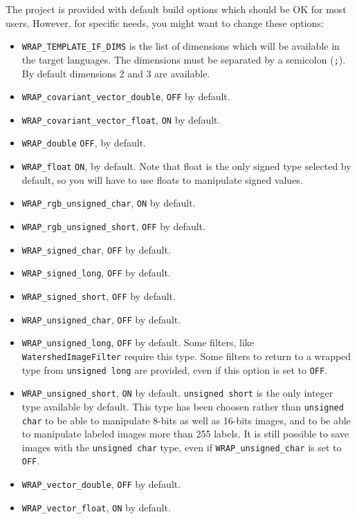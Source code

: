 \documentclass{InsightArticle}
\begin{document}
The project is provided with default build options which should be OK for most
users. However, for specific needs, you might want to change these options:
\begin{itemize}
  \item \verb$WRAP_TEMPLATE_IF_DIMS$ is the list of dimensions which will be available in the
target languages. The dimensions must be separated by a semicolon (\verb$;$).
By default dimensions 2 and 3 are available.
  \item \verb$WRAP_covariant_vector_double$, \verb$OFF$ by default.
  \item \verb$WRAP_covariant_vector_float$, \verb$ON$ by default.
  \item \verb$WRAP_double$ \verb$OFF$, by default.
  \item \verb$WRAP_float$ \verb$ON$, by default. Note that float is the only signed
type selected by default, so you will have to use floats to manipulate signed
values.
  \item \verb$WRAP_rgb_unsigned_char$, \verb$ON$ by default.
  \item \verb$WRAP_rgb_unsigned_short$, \verb$OFF$ by default.
  \item \verb$WRAP_signed_char$, \verb$OFF$ by default.
  \item \verb$WRAP_signed_long$, \verb$OFF$ by default.
  \item \verb$WRAP_signed_short$, \verb$OFF$ by default.
  \item \verb$WRAP_unsigned_char$, \verb$OFF$ by default.
  \item \verb$WRAP_unsigned_long$, \verb$OFF$ by default. Some filters, like
\verb$WatershedImageFilter$ require this type. Some filters to return to a
wrapped type from \verb$unsigned long$ are provided, even if this option is
set to \verb$OFF$.
  \item \verb$WRAP_unsigned_short$, \verb$ON$ by default. \verb$unsigned short$
is the only integer type available by default. This type has been choosen rather
than \verb$unsigned char$ to be able to manipulate 8-bits as well as 16-bits images,
and to be able to manipulate labeled images more than 255 labels. It is still
possible to save images with the \verb$unsigned char$ type, even if
\verb$WRAP_unsigned_char$ is set to \verb$OFF$.
  \item \verb$WRAP_vector_double$, \verb$OFF$ by default.
  \item \verb$WRAP_vector_float$, \verb$ON$ by default.

\end{itemize}
\end{document}
